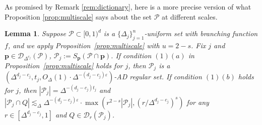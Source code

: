 \documentclass{amsart}
\newtheorem{lemma}[prop]{Lemma}
\newcommand{\eps}{\varepsilon}
\newcommand{\lesim}{\lesssim}
\newcommand{\bp}{\mathbf{p}}
\newcommand{\cD}{\mathcal{D}}
\newcommand{\cP}{\mathcal{P}}
\begin{document}
As promised by Remark \ref{rem:dictionary}, here is a more precise version of what Proposition \ref{prop:multiscale} says about the set $\cP$ at different scales.
\begin{lemma}\label{lem:dictionary}
    Suppose $\cP\subset[0,1)^d$ is a $\{\Delta_j\}_{j=1}^n$-uniform set with branching function $f$, and we apply Proposition~\ref{prop:multiscale} with $u = 2-s$. Fix $j$ and $\bp \in \cD_{\Delta^{c_j}}(\cP)$, $\cP_j := S_\bp (\cP \cap \bp)$. If condition $(1)(a)$ in Proposition~\ref{prop:multiscale} holds for $j$, then $\cP_j$ is a $(\Delta^{d_j-c_j}, t_j, O_\Delta (1) \cdot \Delta^{-(d_j-c_j)\eps})$-AD regular set. If condition $(1)(b)$ holds for $j$, then $|\cP_j| = \Delta^{-(d_j - c_j) t_j}$ and $|\cP_j \cap Q| \lesim_\Delta \Delta^{-(d_j - c_j) \eps} \cdot \max(r^{2-s} |\cP_j|, (r/\Delta^{d_j - c_j})^s)$ for any $r \in [\Delta^{d_j - c_j}, 1]$ and $Q \in \cD_r (\cP_j)$.
\end{lemma}
\end{document}
